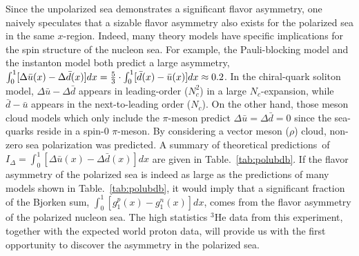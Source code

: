 
 Since the unpolarized sea demonstrates a significant flavor asymmetry, 
 one naively speculates that a sizable flavor asymmetry also exists for 
 the polarized sea in the same $x$-region.
 Indeed, many theory models have specific 
 implications for the spin structure of the nucleon sea. 
For example, the Pauli-blocking model and 
 the instanton model both predict a large asymmetry, 
 $\int_0^1 [\Delta \bar{u}(x)-\Delta \bar{d}(x)]dx={5 \over 3} \cdot \int_0^1 [\bar{d}(x)-\bar{u}(x)]dx \approx 0.2$.
 In the chiral-quark soliton model, $\Delta \bar{u}-\Delta \bar{d}$ appears in leading-order ($N_c^2$) in a large 
$N_c$-expansion, while $\bar{d}-\bar{u}$ appears in the next-to-leading order ($N_c$). 
 On the other hand, those meson cloud models which only include the $\pi$-meson 
predict $\Delta \bar{u}=\Delta \bar{d}=0$ 
 since the sea-quarks reside in a spin-0 $\pi$-meson. By considering a vector meson ($\rho$) cloud, non-zero sea 
 polarization 
 was predicted.
A summary of theoretical
predictions~\cite{Peng:2003zm}of $I_\Delta = \int_0^1 [\Delta \bar{u}(x)-\Delta \bar{d}(x)]dx$ are given in Table.~\ref{tab:polubdb}. If the
 flavor asymmetry of the polarized sea is indeed as large as the predictions of many models 
shown in Table.~\ref{tab:polubdb}, it would imply that a significant fraction of the Bjorken
sum, $\int_0^1[g_1^p(x)-g_1^n(x)]dx$, comes from the flavor asymmetry of the polarized nucleon sea.
The high statistics $^3$He data from this experiment, together with the expected world proton data, 
will provide us with the first opportunity to discover the asymmetry in the polarized sea.
